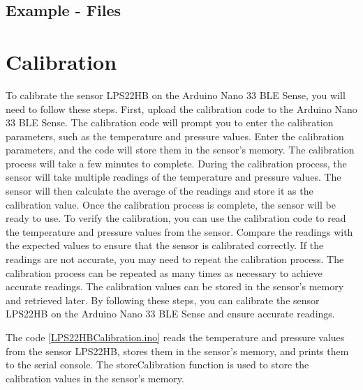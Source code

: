 \subsection{Example - Files}



\section{Calibration}

To calibrate the sensor LPS22HB on the Arduino Nano 33 BLE Sense, you will need to follow these steps. First, upload the calibration code to the Arduino Nano 33 BLE Sense. The calibration code will prompt you to enter the calibration parameters, such as the temperature and pressure values. Enter the calibration parameters, and the code will store them in the sensor's memory. The calibration process will take a few minutes to complete. During the calibration process, the sensor will take multiple readings of the temperature and pressure values. The sensor will then calculate the average of the readings and store it as the calibration value. Once the calibration process is complete, the sensor will be ready to use. To verify the calibration, you can use the calibration code to read the temperature and pressure values from the sensor. Compare the readings with the expected values to ensure that the sensor is calibrated correctly. If the readings are not accurate, you may need to repeat the calibration process. The calibration process can be repeated as many times as necessary to achieve accurate readings. The calibration values can be stored in the sensor's memory and retrieved later. By following these steps, you can calibrate the sensor LPS22HB on the Arduino Nano 33 BLE Sense and ensure accurate readings.





The code \ref{LPS22HBCalibration.ino} reads the temperature and pressure values from the sensor LPS22HB, stores them in the sensor's memory, and prints them to the serial console. The storeCalibration function is used to store the calibration values in the sensor's memory.

\medskip

{
    \label{LPS22HBCalibration.ino}
}

\medskip


